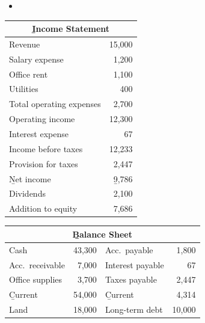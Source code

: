 \begin{example}
\begin{itemize}
        \item {}
    \end{itemize}
    \begin{center}
    \small
    \begin{minipage}[t]{0.42\linewidth}\centering
        \begin{tabular}[t]{lr}
            \toprule
            \multicolumn{2}{c}{\b{Income Statement}} \\
            \midrule
            Revenue & 15,000 \\
            \quad Salary expense & 1,200 \\
            \quad Office rent & 1,100 \\
            \quad Utilities & 400 \\
            Total operating expenses & 2,700 \\
            \midrule
            Operating income & 12,300 \\
            \quad Interest expense & 67 \\
            Income before taxes & 12,233 \\
            \quad Provision for taxes & 2,447 \\
            \midrule
            \b{Net income} & \b{9,786} \\
            \quad Dividends & 2,100 \\
            Addition to equity & 7,686 \\
            \bottomrule
        \end{tabular}
    \end{minipage}
    \hfill
    \begin{minipage}[t]{0.55\linewidth}\centering
        \begin{tabular}[t]{lr|lr}
            \toprule
            \multicolumn{4}{c}{\b{Balance Sheet}} \\
            \midrule
            Cash & 43,300 & Acc.\ payable & 1,800 \\
            Acc.\ receivable & 7,000 & Interest payable & 67 \\
            Office supplies & 3,700 & Taxes payable & 2,447 \\
            \b{Current} & 54,000 & \b{Current} & 4,314 \\
            Land & 18,000 & Long-term debt & 10,000 \\

\end{tabular}
\end{minipage}
\end{center}
\end{example}
